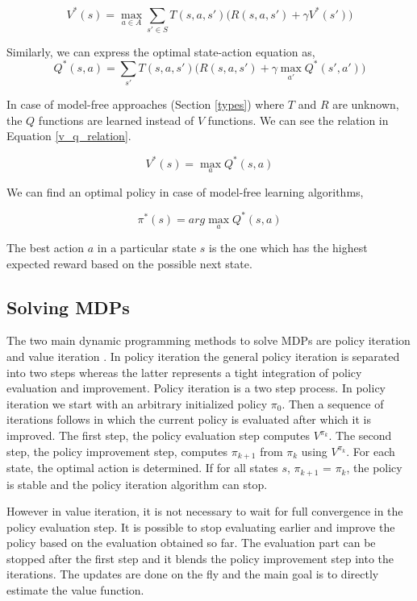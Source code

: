 \documentclass[12pt]{report}
\begin{document}
\begin{equation}
V^*(s) = \max_{a \in A}\sum_{s' \in S} T(s,a,s') \bigg( R(s,a,s') + \gamma V^*(s')\bigg) 
\end{equation}

Similarly, we can express the optimal state-action equation as, 
\begin{equation}
\label{bellman_optimality_equation}
Q^*(s,a) = \sum_{s'} T(s,a,s') \bigg( R(s,a,s') + \gamma \max_{a'}Q^*(s',a')\bigg) 
\end{equation}

In case of model-free approaches (Section \ref{types}) where $T$ and $R$ are unknown, the $Q$ functions are learned instead of $V$ functions. We can see the relation in Equation \ref{v_q_relation}.

\begin{equation}
\label{v_q_relation}
V^*(s) = \max_{a}Q^*(s,a)
\end{equation}

We can find an optimal policy in case of model-free learning algorithms,

\begin{equation}
\pi^*(s) = arg\max_{a}Q^*(s,a)
\end{equation}

The best action $a$ in a particular state $s$ is the one which has the highest expected reward based on the possible next state.


\subsection{Solving MDPs}
\label{bellman}
The two main dynamic programming methods to solve MDPs are policy iteration \cite{kaelbling1998planning} and value iteration \cite{Bellman:1957}. In policy iteration the general policy iteration is separated into two steps whereas the latter represents a tight integration of policy evaluation and improvement. Policy iteration is a two step process. In policy iteration we start with an arbitrary initialized policy $\pi_0$. Then a sequence of iterations follows in which the current policy is evaluated after which it is improved. The first step, the policy evaluation step computes $V^{\pi_k}$. The second step, the policy improvement step, computes $\pi_{k+1}$ from $\pi_k$ using $V^{\pi_k}$. For each state, the optimal action is determined. If for all states $s$, $\pi_{k+1}$ = $\pi_k$, the policy
is stable and the policy iteration algorithm can stop.\par 
However in value iteration, it is not necessary to wait for full convergence in the policy evaluation step.
It is possible to stop evaluating earlier and improve the policy based on the evaluation obtained so far. The evaluation part can be stopped after the first step  and it blends the policy improvement step into the iterations. The updates are done on the fly and the main goal is to directly estimate the value function.
\end{document}
